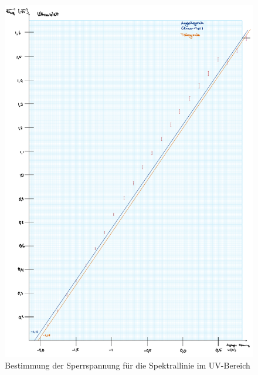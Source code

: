 \begin{figure}[t!]
    \includegraphics[width=1\textwidth, page=1]{img/35/v35-Farbplots.pdf}
    \caption{Bestimmung der Sperrspannung für die Spektrallinie im UV-Bereich}
    \label{fig:uv}
\end{figure}

\newpage

